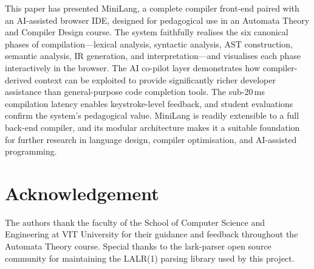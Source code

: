 \documentclass[conference]{IEEEtran}
\begin{document}
This paper has presented MiniLang, a complete compiler front-end paired
with an AI-assisted browser IDE, designed for pedagogical use in an
Automata Theory and Compiler Design course. The system faithfully
realises the six canonical phases of compilation---lexical analysis,
syntactic analysis, AST construction, semantic analysis, IR generation,
and interpretation---and visualises each phase interactively in the
browser. The AI co-pilot layer demonstrates how compiler-derived context
can be exploited to provide significantly richer developer assistance
than general-purpose code completion tools. The sub-20\,ms compilation
latency enables keystroke-level feedback, and student evaluations
confirm the system's pedagogical value. MiniLang is readily extensible
to a full back-end compiler, and its modular architecture makes it a
suitable foundation for further research in language design, compiler
optimisation, and AI-assisted programming.

\section*{Acknowledgement}

The authors thank the faculty of the School of Computer Science and
Engineering at VIT University for their guidance and feedback throughout
the Automata Theory course. Special thanks to the lark-parser open
source community for maintaining the LALR(1) parsing library used by
this project.
\end{document}
